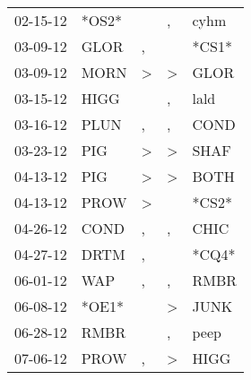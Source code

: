 \begin{supertabular}{p{0.07\textwidth}p{0.06\textwidth}p{0.02\textwidth}p{0.02\textwidth}p{0.06\textwidth}}
          02-15-12\textsuperscript{} &                            *OS2* &                  &                , &           cyhm\textsuperscript{} \\
          03-09-12\textsuperscript{} &           GLOR\textsuperscript{} &                , &                  &                            *CS1* \\
          03-09-12\textsuperscript{} &           MORN\textsuperscript{} &     \textgreater &     \textgreater &           GLOR\textsuperscript{} \\
          03-15-12\textsuperscript{} &           HIGG\textsuperscript{} &                  &                , &           lald\textsuperscript{} \\
          03-16-12\textsuperscript{} &           PLUN\textsuperscript{} &                , &                , &           COND\textsuperscript{} \\
          03-23-12\textsuperscript{} &            PIG\textsuperscript{} &     \textgreater &     \textgreater &           SHAF\textsuperscript{} \\
          04-13-12\textsuperscript{} &            PIG\textsuperscript{} &     \textgreater &     \textgreater &           BOTH\textsuperscript{} \\
          04-13-12\textsuperscript{} &           PROW\textsuperscript{} &     \textgreater &                  &                            *CS2* \\
          04-26-12\textsuperscript{} &           COND\textsuperscript{} &                , &                , &           CHIC\textsuperscript{} \\
          04-27-12\textsuperscript{} &           DRTM\textsuperscript{} &                , &                  &                            *CQ4* \\
          06-01-12\textsuperscript{} &            WAP\textsuperscript{} &                , &                , &           RMBR\textsuperscript{} \\
          06-08-12\textsuperscript{} &                            *OE1* &                  &     \textgreater &           JUNK\textsuperscript{} \\
          06-28-12\textsuperscript{} &           RMBR\textsuperscript{} &                  &                , &           peep\textsuperscript{} \\
          07-06-12\textsuperscript{} &           PROW\textsuperscript{} &                , &     \textgreater &           HIGG\textsuperscript{} \\

\end{supertabular}
